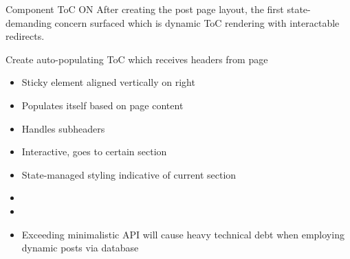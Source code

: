 \documentclass[7px]{article}
\begin{document}
\frontmatter
{Component}
{ToC}
{ON}
{After creating the post page layout, the first state-demanding concern surfaced which is dynamic ToC rendering with interactable redirects.}

\strategy
{
  Create auto-populating ToC which receives headers from page
}
{
  \begin{enumerate}
      \small
      \begin{itemize}[label=$\multimapdotinv$, leftmargin=1.7mm]
        \item Sticky element aligned vertically on right
        \item Populates itself based on page content
        \item Handles subheaders
        \item Interactive, goes to certain section
        \item State-managed styling indicative of current section
      \end{itemize}
      \normalsize
  \end{enumerate}
}
{
  \small
  \begin{itemize}[label=$\multimapdotinv$]
    \item {}
    \item {}
  \end{itemize}
  \normalsize
}
{
  \small
  \begin{itemize}[label=\blitzb]
    \item Exceeding minimalistic API will cause heavy technical debt when employing dynamic posts via database
  \end{itemize}
  \normalsize
}
\end{document}
